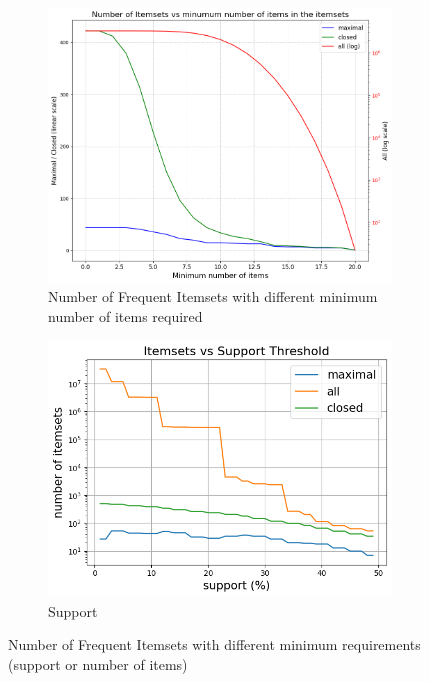\documentclass[a4paper,11pt]{article}
\begin{document}
\begin{figure}
    \centering
    \begin{subfigure}{0.49\linewidth}
        \includegraphics[width=\linewidth]{figures/pattern_mining/output.png}
    \caption{Number of Frequent Itemsets with different minimum number of items required}
    \label{fig:p}
    \end{subfigure}
    \begin{subfigure}{0.5\linewidth}
        \includegraphics[width=\linewidth]{figures/pattern_mining/support.png}
    \caption{Support}
    \label{fig:sup}
    \end{subfigure}
    \caption{Number of Frequent Itemsets with different minimum requirements (support or number of items)}
    \end{figure}
\end{document}
